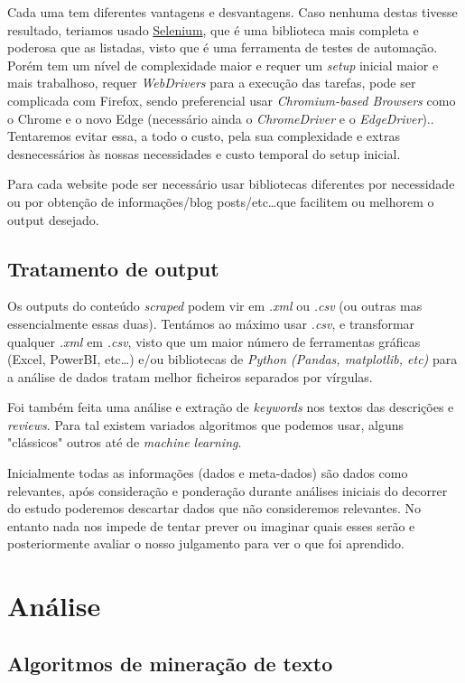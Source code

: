 Cada uma tem diferentes vantagens e desvantagens.
Caso nenhuma destas tivesse resultado, teriamos usado \href{https://pypi.org/project/selenium/}{Selenium}, que é uma biblioteca mais completa e poderosa que as listadas, visto que é uma ferramenta de testes de automação.
Porém tem um nível de complexidade maior e requer um \textit{setup} inicial maior e mais trabalhoso, requer \textit{WebDrivers} para a execução das tarefas, pode ser complicada com Firefox, sendo preferencial usar \textit{Chromium-based Browsers} como o Chrome e o novo Edge (necessário ainda o \textit{ChromeDriver} e o \textit{EdgeDriver})..
Tentaremos evitar essa, a todo o custo, pela sua complexidade e extras desnecessários às nossas necessidades e custo temporal do setup inicial.

Para cada website pode ser necessário usar bibliotecas diferentes por necessidade ou por obtenção de informações/blog posts/etc\ldots que facilitem ou melhorem o output desejado.

\subsection{Tratamento de output}

Os outputs do conteúdo \textit{scraped} podem vir em \textit{.xml} ou \textit{.csv} (ou outras mas essencialmente essas duas).
Tentámos ao máximo usar \textit{.csv}, e transformar qualquer \textit{.xml} em \textit{.csv}, visto que um maior número de ferramentas gráficas (Excel, PowerBI, etc\ldots) e/ou bibliotecas de \textit{Python (Pandas, matplotlib, etc)} para a análise de dados tratam melhor ficheiros separados por vírgulas.

Foi também feita uma análise e extração de \textit{keywords} nos textos das descrições e \textit{reviews}.
Para tal existem variados algoritmos que podemos usar, alguns "clássicos" outros até de \textit{machine learning}.

Inicialmente todas as informações (dados e meta-dados) são dados como relevantes, após consideração e ponderação durante análises iniciais do decorrer do estudo poderemos descartar dados que não consideremos relevantes.
No entanto nada nos impede de tentar prever ou imaginar quais esses serão e posteriormente avaliar o nosso julgamento para ver o que foi aprendido.

\section{Análise}
\subsection{Algoritmos de mineração de texto}

